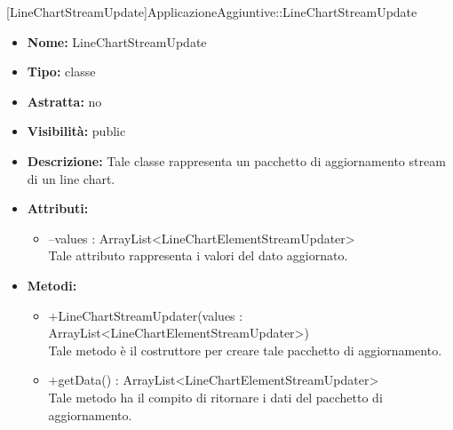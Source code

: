 \begin{itemize}
			\end{itemize}
	
			[LineChartStreamUpdate]{ApplicazioneAggiuntive::LineChartStreamUpdate}
			

	
			
			\begin{itemize}
			\item \textbf{Nome:} LineChartStreamUpdate
			\item \textbf{Tipo:} classe
			
		\item \textbf{Astratta:}
		no
			\item \textbf{Visibilità:} public
			\item \textbf{Descrizione:} Tale classe rappresenta un pacchetto di aggiornamento stream di un line chart.
			\item \textbf{Attributi:}
				\begin{itemize}
				\setlength{\itemsep}{5pt}
				
					\item[\ding{111}] {--values : ArrayList<LineChartElementStreamUpdater>} \\ [1mm] Tale attributo rappresenta i valori del dato aggiornato.
				\end{itemize}
		
			\item \textbf{Metodi:}
				\begin{itemize}
				\setlength{\itemsep}{5pt}
				
					\item[\ding{111}] {{+LineChartStreamUpdater(values : ArrayList<LineChartElementStreamUpdater>)}} \\ [1mm] Tale metodo è il costruttore per creare tale pacchetto di aggiornamento.
					\item[\ding{111}] {{+getData() : ArrayList<LineChartElementStreamUpdater>}} \\ [1mm] Tale metodo ha il compito di ritornare i dati del pacchetto di aggiornamento.
				\end{itemize}
		
			\end{itemize}
	
